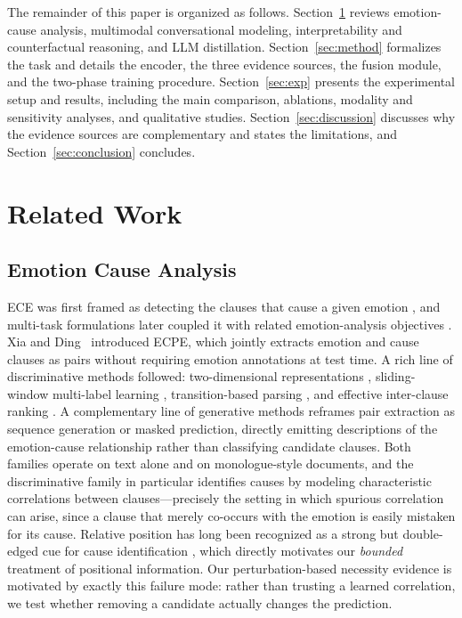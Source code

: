 \documentclass[journal]{IEEEtran}
\begin{document}
The remainder of this paper is organized as follows.
Section~\ref{sec:related} reviews emotion-cause analysis, multimodal conversational
modeling, interpretability and counterfactual reasoning, and LLM distillation.
Section~\ref{sec:method} formalizes the task and details the encoder, the three
evidence sources, the fusion module, and the two-phase training procedure.
Section~\ref{sec:exp} presents the experimental setup and results, including the main
comparison, ablations, modality and sensitivity analyses, and qualitative studies.
Section~\ref{sec:discussion} discusses why the evidence sources are complementary and
states the limitations, and Section~\ref{sec:conclusion} concludes.

\section{Related Work}
\label{sec:related}

\subsection{Emotion Cause Analysis}
ECE was first framed as detecting the clauses that cause a given emotion
\cite{lee2010emotion}, and multi-task formulations later coupled it with related
emotion-analysis objectives \cite{turcan2021multitask}. Xia and Ding~\cite{xia2019ecpe} introduced ECPE,
which jointly extracts emotion and cause clauses as pairs without requiring emotion
annotations at test time. A rich line of discriminative methods followed: two-dimensional
representations \cite{ding2020ecpe2d}, sliding-window multi-label learning
\cite{ding2020end2end}, transition-based parsing \cite{fan2020transition}, and
effective inter-clause ranking \cite{wei2020rankcp}. A complementary line of
generative methods reframes pair extraction as sequence generation or masked
prediction, directly emitting descriptions of the emotion-cause relationship rather
than classifying candidate clauses. Both families operate on text alone and on
monologue-style documents, and the discriminative family in particular identifies
causes by modeling characteristic correlations between clauses---precisely the setting
in which spurious correlation can arise, since a clause that merely co-occurs with the
emotion is easily mistaken for its cause. Relative position has long been recognized as
a strong but double-edged cue for cause identification \cite{ding2019ece}, which
directly motivates our \emph{bounded} treatment of positional information. Our perturbation-based necessity evidence is
motivated by exactly this failure mode: rather than trusting a learned correlation, we
test whether removing a candidate actually changes the prediction.
\end{document}
